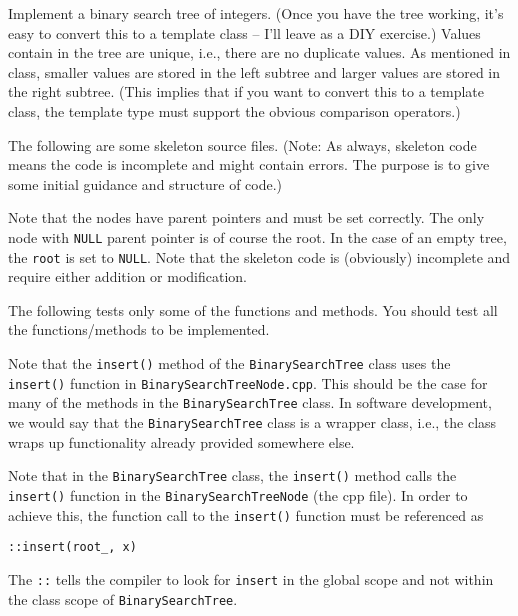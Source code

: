 
Implement a binary search tree of integers. 
(Once you have the tree working, it's easy to convert this to a 
template class -- I'll leave as a DIY exercise.)
Values contain in the tree are unique, i.e., there are no duplicate values.
As mentioned in class,
smaller values are stored in the left subtree and larger values are
stored in the right subtree.
(This implies that if you want to convert this to a template class,
the template type must support the obvious comparison operators.)

The following are some skeleton source files.
(Note: As always, skeleton
code means the code is incomplete and might contain errors.
The purpose is to give some initial guidance and structure of code.)
 
Note that the nodes have parent pointers and must be set correctly.
The only node with \verb!NULL! parent pointer is of course the root.
In the case of an empty tree, the \verb!root! is set to \verb!NULL!.
Note that the skeleton code is (obviously) incomplete and require
either addition or modification.







The following tests only some of the functions and methods. 
You should test all the functions/methods to be implemented.


Note that the \verb!insert()! method of the 
\verb!BinarySearchTree! class uses the \verb!insert()! function in 
\verb!BinarySearchTreeNode.cpp!.
This should be the case for many of the methods in the \verb!BinarySearchTree!
class.
In software development, we would say that the \verb!BinarySearchTree!
class is a wrapper class, i.e., the class wraps up functionality already
provided somewhere else.

Note that in the \verb!BinarySearchTree! class, the \verb!insert()!
method calls the \verb!insert()! function in the 
\verb!BinarySearchTreeNode! (the cpp file). 
In order to achieve this, the function call to the \verb!insert()!
function must be referenced as
\begin{Verbatim}
::insert(root_, x)
\end{Verbatim}
The \verb!::! tells the compiler to look for \verb!insert! in the 
global scope and not within the class scope of \verb!BinarySearchTree!.

